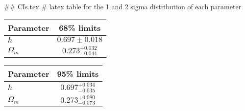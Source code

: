 ## CIs.tex
# latex table for the 1 and 2 sigma distribution of each parameter

\begin{tabular} { l  c}
 Parameter &  68\% limits\\
\hline
{\boldmath$h              $} & $0.697\pm 0.018            $\\
{\boldmath$\Omega_m       $} & $0.273^{+0.032}_{-0.044}   $\\
\hline
\end{tabular}

\begin{tabular} { l  c}
 Parameter &  95\% limits\\
\hline
{\boldmath$h              $} & $0.697^{+0.034}_{-0.035}   $\\
{\boldmath$\Omega_m       $} & $0.273^{+0.080}_{-0.073}   $\\
\hline
\end{tabular}
